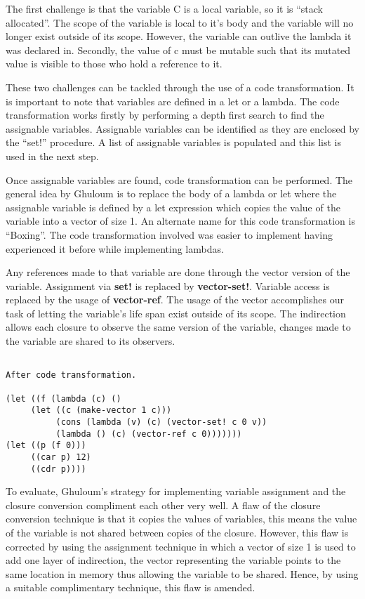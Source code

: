\documentclass{article}
\begin{document}
The first challenge is that the variable C is a local variable, so it is ``stack allocated''. The scope of the variable is local to it's body and the variable will no longer exist outside of its scope. However, the variable can outlive the lambda it was declared in. Secondly, the value of c must be mutable such that its mutated value is visible to those who hold a reference to it.

These two challenges can be tackled through the use of a code transformation. It is important to note that variables are defined in a let or a lambda. The code transformation works firstly by performing a depth first search to find the assignable variables. Assignable variables can be identified as they are enclosed by the ``set!'' procedure. A list of assignable variables is populated and this list is used in the next step. 

Once assignable variables are found, code transformation can be performed. The general idea by Ghuloum is to replace the body of a lambda or let where the assignable variable is defined by a let expression which copies the value of the variable into a vector of size 1. An alternate name for this code transformation is ``Boxing''. The code transformation involved was easier to implement having experienced it before while implementing lambdas. 

Any references made to that variable are done through the vector version of the variable. Assignment via \textbf{set!} is replaced by \textbf{vector-set!}. Variable access is replaced by the usage of \textbf{vector-ref}. The usage of the vector accomplishes our task of letting the variable's life span exist outside of its scope. The indirection allows each closure to observe the same version of the variable, changes made to the variable are shared to its observers.

\begin{verbatim}

After code transformation. 

(let ((f (lambda (c) ()
     (let ((c (make-vector 1 c)))
     	  (cons (lambda (v) (c) (vector-set! c 0 v))
	  	  (lambda () (c) (vector-ref c 0)))))))
(let ((p (f 0)))
     ((car p) 12)
     ((cdr p))))
\end{verbatim}

To evaluate, Ghuloum's strategy for implementing variable assignment and the closure conversion compliment each other very well. A flaw of the closure conversion technique is that it copies the values of variables, this means the value of the variable is not shared between copies of the closure. However, this flaw is corrected by using the assignment technique in which a vector of size 1 is used to add one layer of indirection, the vector representing the variable points to the same location in memory thus allowing the variable to be shared. Hence, by using a suitable complimentary technique, this flaw is amended.
\end{document}
